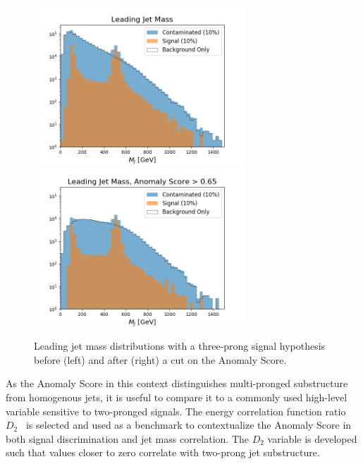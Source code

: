 \documentclass[12pt, a4paper]{article}
\begin{document}
\begin{figure}[H]
	\begin{center}
		\includegraphics[width=225pt]{imgs/3Prong_Contaminated_10p0_J_Mass_Multi_SaveForPaper.png}
		\includegraphics[width=225pt]{imgs/3Prong_Contaminated_10p0_J_Mass_AnomScore0p65_Multi_SaveForPaper.png}
	\end{center}
	\caption{Leading jet mass distributions with a three-prong signal hypothesis before (left) and after (right) a cut on the Anomaly Score.}
	\label{fig:3P_lj_mass}
\end{figure}




As the Anomaly Score in this context distinguishes multi-pronged substructure from homogenous jets, it is useful to compare it to a commonly used high-level variable sensitive to two-pronged signals. The energy correlation function ratio $D_2$~\cite{d2} is selected and used as a benchmark to contextualize the Anomaly Score in both signal discrimination and jet mass correlation. The $D_2$ variable is developed such that values closer to zero correlate with two-prong jet substructure. 
\end{document}
